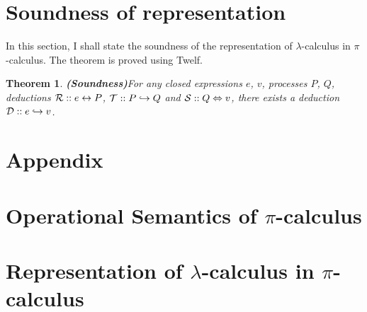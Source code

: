 \documentclass[12pt]{article}
\newtheorem{thm}{Theorem}[section]
\begin{document}
\section{Soundness of representation}
	In this section, I shall state the soundness of the representation of $\lambda$-calculus in $\pi$-calculus. The theorem is proved using Twelf.
\begin{thm}
{\bf (Soundness)}For any closed expressions $e$, $v$, processes $P$, $Q$, deductions ${\cal R}:: e \leftrightarrow P$, ${\cal T}::P \hookrightarrow Q$ and ${\cal S} :: Q \Leftrightarrow v$, there exists a deduction ${\cal D} :: e \hookrightarrow v$.
\end{thm}
\section*{Appendix}
\appendix
\section{Operational Semantics of $\pi$-calculus}
\label{sec:oper}

\section{Representation of $\lambda$-calculus in $\pi$-calculus}
\label{sec:rep}


\end{document}
